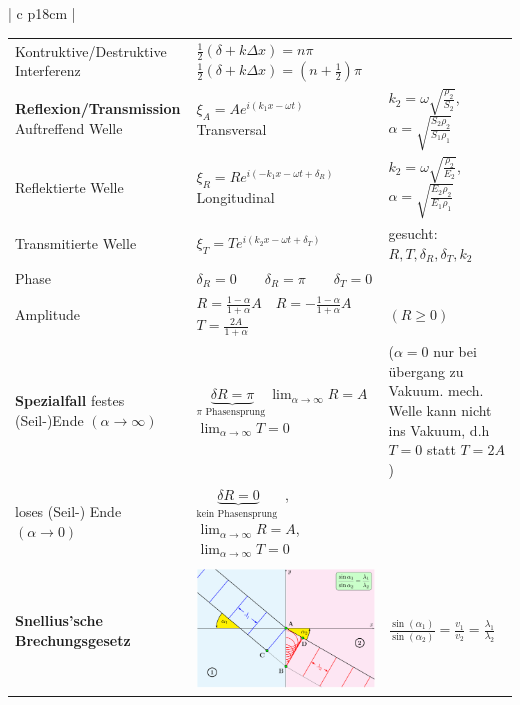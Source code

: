 \begin{tabular}{ | c   p{18cm} |}
\begin{tabular}{L{5cm} L{7cm} L{5cm}}
			Kontruktive/Destruktive Interferenz&$\frac{1}{2}(\delta+k \Delta x)=n \pi$ \quad $\frac{1}{2}(\delta+k \Delta x)=\left(n+\frac{1}{2}\right) \pi$& \\
			
			\rowcolor[rgb]{0.91,0.91,0.91}
			\textbf{Reflexion/Transmission} Auftreffend Welle& $\displaystyle\xi_{A}=A e^{i\left(k_{1} x-\omega t\right)}$ \qquad\qquad \qquad Transversal&  $\displaystyle k_{2}=\omega \sqrt{\frac{\rho_{2}}{S_{2}}}$, $ \displaystyle \alpha=\sqrt{\frac{S_{2} \rho_{2}}{S_{1} \rho_{1}}}$\\
			Reflektierte Welle&	$\displaystyle\xi_{R}=R e^{i\left(-k_{1} x-\omega t+\delta_{R}\right)}$ \qquad\qquad Longitudinal& $\displaystyle k_{2}=\omega \sqrt{\frac{\rho_{2}}{E_{2}}}$,$\displaystyle \alpha=\sqrt{\frac{E_{2} \rho_{2}}{E_{1} \rho_{1}}}$ \\
			Transmitierte Welle&$\displaystyle \xi_{T}=T e^{i\left(k_{2} x-\omega t+\delta_{T}\right)}$&  gesucht: $\displaystyle R,T,\delta_{R}, \delta_{T}, k_{2} $ \\
			Phase &$\delta_{R}=0 \qquad \delta_{R}=\pi \qquad \delta_{T}=0$&\\
			Amplitude &$R=\frac{1-\alpha}{1+\alpha} A \quad R=-\frac{1-\alpha}{1+\alpha} A$\qquad $T=\frac{2 A}{1+\alpha}$&$(R \geq 0)$ \\
			
			
			\textbf{Spezialfall} \qquad festes (Seil-)Ende $(\alpha \rightarrow \infty)$& $\displaystyle\underbrace{\delta R=\pi}_{\pi \text { Phasensprung }}$\quad$\displaystyle\lim _{\alpha \rightarrow \infty} R=A$\quad $\displaystyle \lim _{\alpha \rightarrow \infty} T=0$ &($\alpha = 0$ nur bei übergang zu Vakuum. mech. Welle
			kann nicht ins Vakuum, d.h $T = 0$ statt $T = 2A$)\\
			loses (Seil-) Ende $(\alpha \rightarrow 0)$&$\displaystyle\underbrace{\delta R=0}_{\text {kein Phasensprung }}$ , $\displaystyle \lim _{\alpha \rightarrow \infty} R=A$, $\displaystyle\lim _{\alpha \rightarrow \infty} T=0$&\\[10pt]
			
			&&\\[-15pt]
			\textbf{Snellius’sche Brechungsgesetz} &
			\includegraphics[width=7cm]{huygens2.png}&$\displaystyle\frac{\sin \left(\alpha_{1}\right)}{\sin \left(\alpha_{2}\right)}=\frac{v_{1}}{v_{2}}=\frac{\lambda_{1}}{\lambda_{2}}$ \\[10pt]
			

\end{tabular}
\end{tabular}
